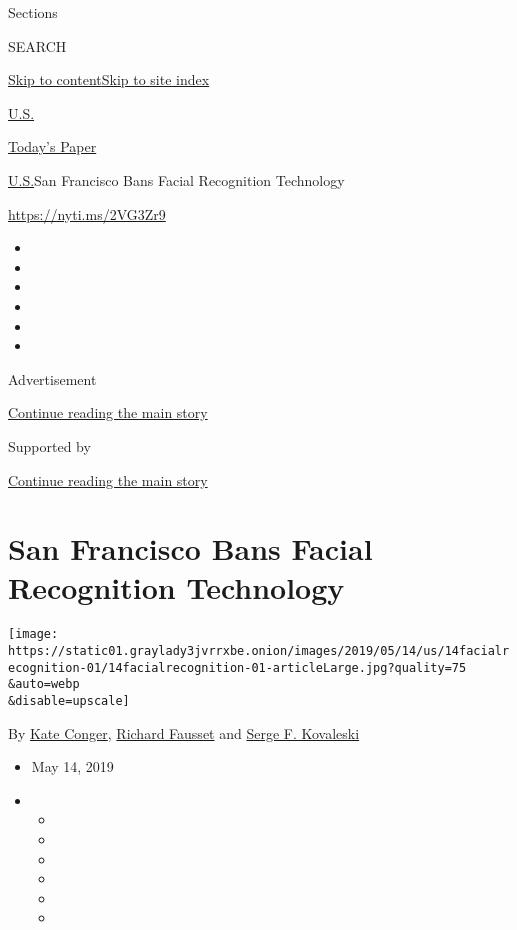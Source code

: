 Sections

SEARCH

\protect\hyperlink{site-content}{Skip to
content}\protect\hyperlink{site-index}{Skip to site index}

\href{https://www.nytimes3xbfgragh.onion/section/us}{U.S.}

\href{https://myaccount.nytimes3xbfgragh.onion/auth/login?response_type=cookie\&client_id=vi}{}

\href{https://www.nytimes3xbfgragh.onion/section/todayspaper}{Today's
Paper}

\href{/section/us}{U.S.}\textbar{}San Francisco Bans Facial Recognition
Technology

\url{https://nyti.ms/2VG3Zr9}

\begin{itemize}
\item
\item
\item
\item
\item
\item
\end{itemize}

Advertisement

\protect\hyperlink{after-top}{Continue reading the main story}

Supported by

\protect\hyperlink{after-sponsor}{Continue reading the main story}

\hypertarget{san-francisco-bans-facial-recognition-technology}{%
\section{San Francisco Bans Facial Recognition
Technology}\label{san-francisco-bans-facial-recognition-technology}}

\texttt{[image: https://static01.graylady3jvrrxbe.onion/images/2019/05/14/us/14facialrecognition-01/14facialrecognition-01-articleLarge.jpg?quality=75\\\&auto=webp\\\&disable=upscale]}

By \href{https://www.nytimes3xbfgragh.onion/by/kate-conger}{Kate
Conger},
\href{https://www.nytimes3xbfgragh.onion/by/richard-fausset}{Richard
Fausset} and
\href{https://www.nytimes3xbfgragh.onion/by/serge-f-kovaleski}{Serge F.
Kovaleski}

\begin{itemize}
\item
  May 14, 2019
\item
  \begin{itemize}
  \item
  \item
  \item
  \item
  \item
  \item
  \end{itemize}
\end{itemize}

